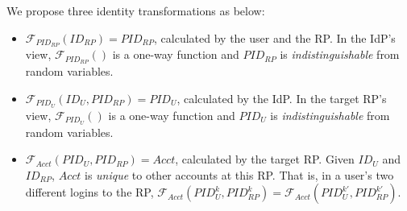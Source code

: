 We propose three identity transformations as below:
\vspace{-\topsep}\begin{itemize}
\setlength{\topsep}{0pt}
\setlength{\partopsep}{0pt}
\setlength{\itemsep}{0pt}
\setlength{\parsep}{0pt}
\setlength{\parskip}{0pt}
\item
$\mathcal{F}_{PID_{RP}}(ID_{RP}) = PID_{RP}$, calculated by the user and the RP.
In the IdP's view,
$\mathcal{F}_{PID_{RP}}()$ is a one-way function and $PID_{RP}$
is \emph{indistinguishable} from random variables.
\item
$\mathcal{F}_{PID_U}(ID_U, PID_{RP}) = PID_{U}$, calculated by the IdP.
In the target RP's view,
    $\mathcal{F}_{PID_U}()$ is a one-way function and $PID_{U}$ is \emph{indistinguishable} from random variables.
\item
$\mathcal{F}_{Acct}(PID_{U}, PID_{RP}) = Acct$, calculated by the target RP.
Given $ID_U$ and $ID_{RP}$, $Acct$ is %
\emph{unique} to other accounts at this RP.
That is, in a user's two different logins to the RP,
 $\mathcal{F}_{Acct}(PID_{U}^k, PID_{RP}^k) = \mathcal{F}_{Acct}(PID_{U}^{k'}, PID_{RP}^{k'})$.
\end{itemize}



